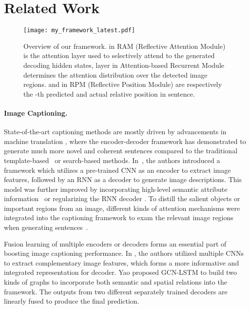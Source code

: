 \documentclass[10pt,twocolumn,letterpaper]{article}
\begin{document}
\section{Related Work}
\begin{figure*}[t]
	\centering
	\texttt{[image: my\_framework\_latest.pdf]}
	\caption{Overview of our framework.  in RAM (Reflective Attention Module) is the attention layer used to selectively attend to the generated decoding hidden states,  layer in Attention-based Recurrent Module determines the attention distribution over the detected image regions.  and  in RPM (Reflective Position Module) are respectively the -th predicted and actual relative position in sentence.}
	\label{fig:model}
	\vspace{-0.3cm}
\end{figure*}

\paragraph{Image Captioning.}
State-of-the-art captioning methods are mostly driven by advancements in machine translation \cite{cho2014learning,sutskever2014sequence}, where the encoder-decoder framework has demonstrated to generate much more novel and coherent sentences compared to the traditional template-based~\cite{kulkarni2013babytalk,yang2011corpus} or search-based \cite{devlin2015language} methods.
In~\cite{donahue2015long,vinyals2015showtell}, the authors introduced a framework which utilizes a pre-trained CNN as an encoder to extract image features, followed by an RNN as a decoder to generate image descriptions.
This model was further improved by incorporating high-level semantic attribute information~\cite{wu2016value,yao2017boosting} or regularizing the RNN decoder \cite{chen2018regularizing}.
To distill the salient objects or important regions from an image, different kinds of attention mechanisms were integrated into the captioning framework to exam the relevant image regions when generating sentences~\cite{anderson2017bottom,lu2017knowing,xu2015showattendtell,yang2016review,you2016image}.


Fusion learning of multiple encoders or decoders forms an essential part of boosting image captioning performance.
In \cite{jiang2018recurrent}, the authors utilized multiple CNNs to extract complementary image features, which forms a more informative and integrated representation for decoder.
Yao \etal \cite{yao2018exploring} proposed GCN-LSTM to build two kinds of graphs to incorporate both semantic and spatial relations into the framework.
The outputs from two different separately trained decoders are linearly fused to produce the final prediction.
\end{document}
